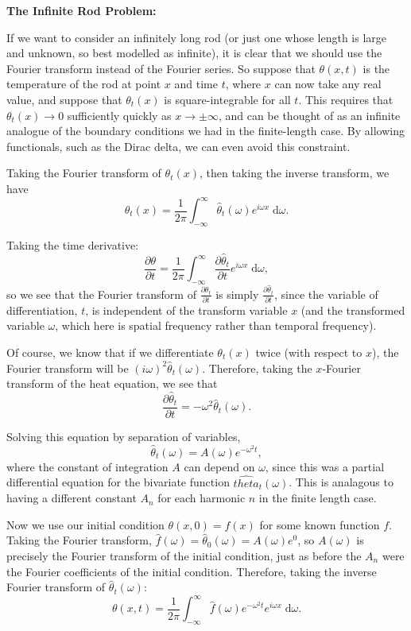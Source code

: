 \documentclass{article}
\newcommand{\diff}{\;\mathrm{d}}
\begin{document}
\clearpage



\textbf{The Infinite Rod Problem:}\bigskip


If we want to consider an infinitely long rod (or just one whose length is large and unknown, so best modelled as infinite), it is clear that we should use the Fourier transform instead of the Fourier series. So suppose that $\theta(x,t)$ is the temperature of the rod at point $x$ and time $t$, where $x$ can now take any real value, and suppose that $\theta_t(x)$ is square-integrable for all $t$. This requires that $\theta_t(x)\to 0$ sufficiently quickly as $x\to \pm\infty$, and can be thought of as an infinite analogue of the boundary conditions we had in the finite-length case. By allowing functionals, such as the Dirac delta, we can even avoid this constraint.

Taking the Fourier transform of $\theta_t(x)$, then taking the inverse transform, we have
\[\theta_t(x)=\frac{1}{2\pi}\int_{-\infty}^\infty \hat{\theta}_t(\omega)e^{i\omega x}\diff \omega.\]

Taking the time derivative:
\[\frac{\partial \theta}{\partial t} = \frac{1}{2\pi}\int_{-\infty}^\infty \frac{\partial \hat{\theta}_t}{\partial t}e^{i\omega x}\diff \omega,\]
so we see that the Fourier transform of $\frac{\partial\theta_t}{\partial t}$ is simply $\frac{\partial\hat{\theta}_t}{\partial t}$, since the variable of differentiation, $t$, is independent of the transform variable $x$ (and the transformed variable $\omega$, which here is spatial frequency rather than temporal frequency).

Of course, we know that if we differentiate $\theta_t(x)$ twice (with respect to $x$), the Fourier transform will be $(i\omega)^2\hat{\theta}_t(\omega)$. Therefore, taking the $x$-Fourier transform of the heat equation, we see that
\[\frac{\partial\hat{\theta}_t}{\partial t}=-\omega^2\hat{\theta}_t(\omega).\]

Solving this equation by separation of variables,
\[\hat{\theta}_t(\omega)=A(\omega)e^{-\omega^2 t},\]
where the constant of integration $A$ can depend on $\omega$, since this was a partial differential equation for the bivariate function $\hat{theta}_t(\omega)$. This is analagous to having a different constant $A_n$ for each harmonic $n$ in the finite length case.

Now we use our initial condition $\theta(x,0)=f(x)$ for some known function $f$. Taking the Fourier transform, $\hat{f}(\omega)=\hat{\theta}_0(\omega)=A(\omega)e^0$, so $A(\omega)$ is precisely the Fourier transform of the initial condition, just as before the $A_n$ were the Fourier coefficients of the initial condition. Therefore, taking the inverse Fourier transform of $\hat{\theta}_t(\omega)$:
\[\theta(x,t)=\frac{1}{2\pi}\int_{-\infty}^\infty \hat{f}(\omega)e^{-\omega^2 t}e^{i\omega x}\diff \omega.\]
\end{document}
